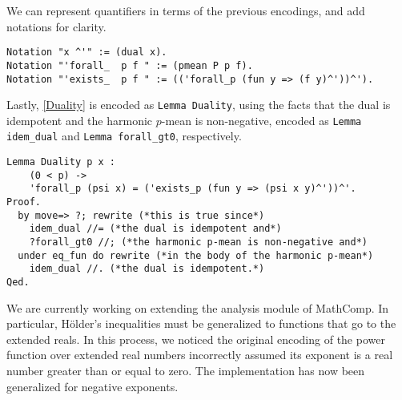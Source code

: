 We can represent quantifiers in terms of the previous encodings, and add notations for clarity.
\begin{verbatim}
Notation "x ^'" := (dual x).
Notation "'forall_  p f " := (pmean P p f).
Notation "'exists_  p f " := (('forall_p (fun y => (f y)^'))^').
\end{verbatim}
Lastly, \cref{Duality} is encoded as \texttt{Lemma Duality}, using the facts that the dual is idempotent and the harmonic $p$-mean is non-negative, encoded as \texttt{Lemma idem\_dual} and \texttt{Lemma forall\_gt0}, respectively.
\begin{verbatim}
Lemma Duality p x : 
    (0 < p) -> 
    'forall_p (psi x) = ('exists_p (fun y => (psi x y)^'))^'. 
Proof.
  by move=> ?; rewrite (*this is true since*)
    idem_dual //= (*the dual is idempotent and*)
    ?forall_gt0 //; (*the harmonic p-mean is non-negative and*)
  under eq_fun do rewrite (*in the body of the harmonic p-mean*)
    idem_dual //. (*the dual is idempotent.*)
Qed.
\end{verbatim}
We are currently working on extending the analysis module of MathComp.
In particular, Hölder's inequalities must be generalized to functions that go to the extended reals. In this process, we noticed the original encoding of the power function over extended real numbers incorrectly assumed its exponent is a real number greater than or equal to zero. The implementation has now been generalized for negative exponents.



